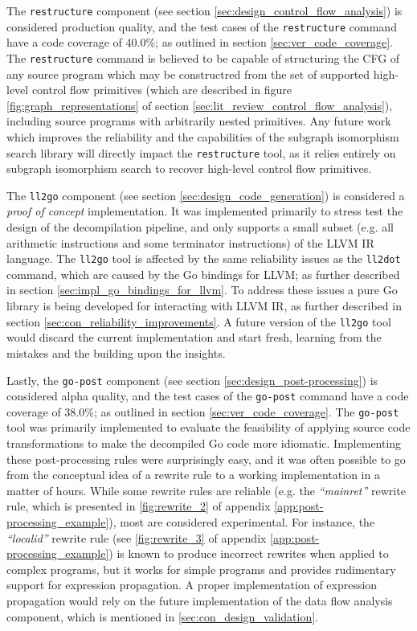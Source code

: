 The \texttt{restructure} component (see section \ref{sec:design_control_flow_analysis}) is considered production quality, and the test cases of the \texttt{restructure} command have a code coverage of 40.0\%; as outlined in section \ref{sec:ver_code_coverage}. The \texttt{restructure} command is believed to be capable of structuring the CFG of any source program which may be constructred from the set of supported high-level control flow primitives (which are described in figure \ref{fig:graph_representations} of section \ref{sec:lit_review_control_flow_analysis}), including source programs with arbitrarily nested primitives. Any future work which improves the reliability and the capabilities of the subgraph isomorphism search library will directly impact the \texttt{restructure} tool, as it relies entirely on subgraph isomorphism search to recover high-level control flow primitives.

The \texttt{ll2go} component (see section \ref{sec:design_code_generation}) is considered a \textit{proof of concept} implementation. It was implemented primarily to stress test the design of the decompilation pipeline, and only supports a small subset (e.g. all arithmetic instructions and some terminator instructions) of the LLVM IR language. The \texttt{ll2go} tool is affected by the same reliability issues as the \texttt{ll2dot} command, which are caused by the Go bindings for LLVM; as further described in section \ref{sec:impl_go_bindings_for_llvm}. To address these issues a pure Go library is being developed for interacting with LLVM IR, as further described in section \ref{sec:con_reliability_improvements}. A future version of the \texttt{ll2go} tool would discard the current implementation and start fresh, learning from the mistakes and the building upon the insights.

Lastly, the \texttt{go-post} component (see section \ref{sec:design_post-processing}) is considered alpha quality, and the test cases of the \texttt{go-post} command have a code coverage of 38.0\%; as outlined in section \ref{sec:ver_code_coverage}. The \texttt{go-post} tool was primarily implemented to evaluate the feasibility of applying source code transformations to make the decompiled Go code more idiomatic. Implementing these post-processing rules were surprisingly easy, and it was often possible to go from the conceptual idea of a rewrite rule to a working implementation in a matter of hours. While some rewrite rules are reliable (e.g. the \textit{``mainret''} rewrite rule, which is presented in \ref{fig:rewrite_2} of appendix \ref{app:post-processing_example}), most are considered experimental. For instance, the \textit{``localid''} rewrite rule (see \ref{fig:rewrite_3} of appendix \ref{app:post-processing_example}) is known to produce incorrect rewrites when applied to complex programs, but it works for simple programs and provides rudimentary support for expression propagation. A proper implementation of expression propagation would rely on the future implementation of the data flow analysis component, which is mentioned in \ref{sec:con_design_validation}.





